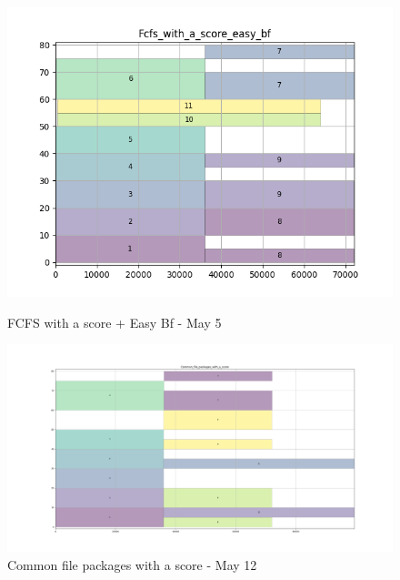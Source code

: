 \documentclass[a4paper]{article}
\begin{document}
\begin{figure}[H]
\begin{minipage}[b]{0.5\linewidth}
    \centering
    \includegraphics[width=1.11\linewidth]{MBSS/plot/Gantt_charts/test/Fcfs_with_a_score_easy_bf.png} 
    \caption{FCFS with a score + Easy Bf - May 5} 
    \vspace{4ex}
  \end{minipage}%
  \begin{minipage}[b]{0.5\linewidth}
    \centering
    \includegraphics[width=1.11\linewidth]{MBSS/plot/Gantt_charts/test/Common_file_packages_with_a_score.png} 
    \caption{Common file packages with a score - May 12} 
    \vspace{4ex}
  \end{minipage}
\end{figure}
\end{document}
